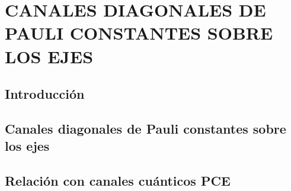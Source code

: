\chapter{CANALES DIAGONALES DE PAULI CONSTANTES 
SOBRE LOS EJES}

\section{Introducción}

\section{Canales diagonales de Pauli constantes sobre los ejes}

\section{Relación con canales cuánticos PCE}